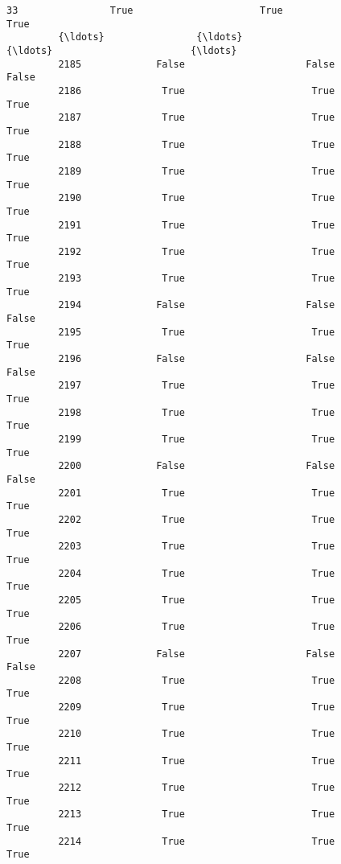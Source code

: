 \documentclass[11pt]{llncs}
\begin{document}
\begin{Verbatim}[commandchars=\\\{\}]
         33                True                      True                       True   
         {\ldots}                {\ldots}                       {\ldots}                        {\ldots}   
         2185             False                     False                      False   
         2186              True                      True                       True   
         2187              True                      True                       True   
         2188              True                      True                       True   
         2189              True                      True                       True   
         2190              True                      True                       True   
         2191              True                      True                       True   
         2192              True                      True                       True   
         2193              True                      True                       True   
         2194             False                     False                      False   
         2195              True                      True                       True   
         2196             False                     False                      False   
         2197              True                      True                       True   
         2198              True                      True                       True   
         2199              True                      True                       True   
         2200             False                     False                      False   
         2201              True                      True                       True   
         2202              True                      True                       True   
         2203              True                      True                       True   
         2204              True                      True                       True   
         2205              True                      True                       True   
         2206              True                      True                       True   
         2207             False                     False                      False   
         2208              True                      True                       True   
         2209              True                      True                       True   
         2210              True                      True                       True   
         2211              True                      True                       True   
         2212              True                      True                       True   
         2213              True                      True                       True   
         2214              True                      True                       True   
         

\end{Verbatim}
\end{document}
